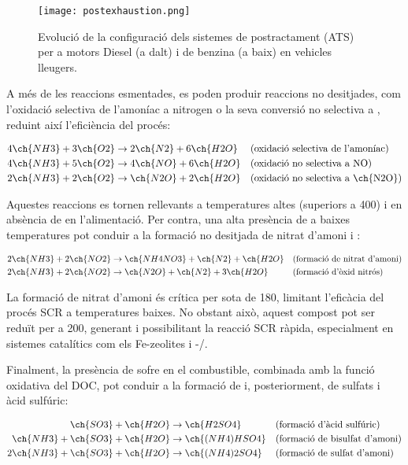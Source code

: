 \begin{figure}[h!]
    \centering
    \texttt{[image: postexhaustion.png]}
    \caption{Evolució de la configuració dels sistemes de postractament (ATS) per a motors Diesel (a dalt) i de benzina (a baix) en vehicles lleugers\cite{selleri_overview_2021}.}
    \label{Fig:ATS}
\end{figure}

A més de les reaccions esmentades, es poden produir reaccions no desitjades, com l'oxidació selectiva de l'amoníac a nitrogen o la seva conversió no selectiva a , reduint així l'eficiència del procés: 

\begin{align}
    4 \ch{NH3} + 3 \ch{O2} &\rightarrow 2 \ch{N2} + 6 \ch{H2O} && \text{(oxidació selectiva de l'amoníac)} \\
    4 \ch{NH3} + 5 \ch{O2} &\rightarrow 4 \ch{NO} + 6 \ch{H2O} && \text{(oxidació no selectiva a NO)} \\
    2 \ch{NH3} + 2 \ch{O2} &\rightarrow \ch{N2O} + 2 \ch{H2O} && \text{(oxidació no selectiva a \ch{N2O})}
\end{align}

Aquestes reaccions es tornen rellevants a temperatures altes (superiors a \qty{400}{\degC}) i en absència de  en l'alimentació. Per contra, una alta presència de  a baixes temperatures pot conduir a la formació no desitjada de nitrat d'amoni i :

\begin{align}
    2 \ch{NH3} + 2 \ch{NO2} &\rightarrow \ch{NH4NO3} + \ch{N2} + \ch{H2O} && \text{(formació de nitrat d'amoni)} \\
    2 \ch{NH3} + 2 \ch{NO2} &\rightarrow \ch{N2O} + \ch{N2} + 3 \ch{H2O} && \text{(formació d'òxid nitrós)}
\end{align}

La formació de nitrat d'amoni és crítica per sota de \qty{180}{\degC}, limitant l'eficàcia del procés SCR a temperatures baixes. No obstant això, aquest compost pot ser reduït per  a \qty{200}{\degC}, generant  i possibilitant la reacció SCR ràpida, especialment en sistemes catalítics com els Fe-zeolites i -/.

Finalment, la presència de sofre en el combustible, combinada amb la funció oxidativa del DOC, pot conduir a la formació de  i, posteriorment, de sulfats i àcid sulfúric:

\begin{align}
    \ch{SO3} + \ch{H2O} &\rightarrow \ch{H2SO4} && \text{(formació d'àcid sulfúric)} \\
    \ch{NH3} + \ch{SO3} + \ch{H2O} &\rightarrow \ch{(NH4)HSO4} && \text{(formació de bisulfat d'amoni)} \\
    2 \ch{NH3} + \ch{SO3} + \ch{H2O} &\rightarrow \ch{(NH4)2SO4} && \text{(formació de sulfat d'amoni)}
\end{align}


